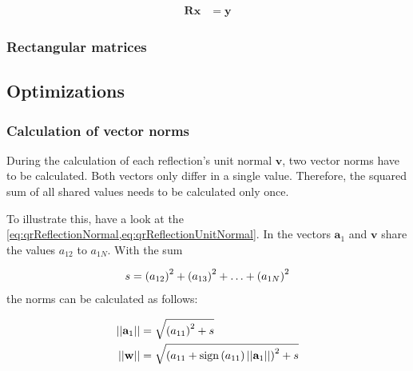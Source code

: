 \begin{align}
\mathbf{R}\mathbf{x} &= \mathbf{y}
\end{align}





\subsubsection{Rectangular matrices}




\subsection{Optimizations}
\label{sec:qrOptimizations}




\subsubsection{Calculation of vector norms}
\label{sec:qrOptimizationsVectorNorms}

During the calculation of each reflection's unit normal $\mathbf{v}$, two vector norms have to be calculated.
Both vectors only differ in a single value.
Therefore, the squared sum of all shared values needs to be calculated only once.

To illustrate this, have a look at the \cref{eq:qrReflectionNormal,eq:qrReflectionUnitNormal}.
In the vectors $\mathbf{a}_1$ and $\mathbf{v}$ share the values $a_{12}$ to $a_{1N}$.
With the sum 

\begin{align}
s =  \left(a_{12}\right)^2  + \left(a_{13}\right)^2 + \hdots + \left(a_{1N}\right)^2  
\end{align}
%
the norms can be calculated as follows:

\begin{align}
\left\vert\left\vert\mathbf{a}_1\right\vert\right\vert &= \sqrt{\left(a_{11}\right)^2 + s}\\
\left\vert\left\vert\mathbf{w}\right\vert\right\vert &= \sqrt{\left(a_{11} + \textrm{sign}\left(a_{11}\right) \left\vert\left\vert\mathbf{a}_1\right\vert\right\vert\right)^2 + s}
\end{align}



